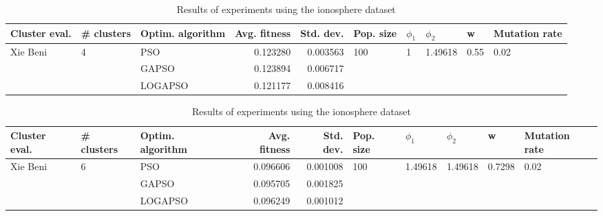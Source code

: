 \documentclass{article}
\begin{document}
\begin{table}
\centering
\caption{Results of experiments using the ionosphere dataset}
\begin{tabular}{lllrrlllll}
\toprule
            Cluster eval. &        \# clusters & Optim. algorithm &  Avg. fitness &  Std. dev. &            Pop. size &         $\phi_{1}$ &               $\phi_{2}$ &                     w &         Mutation rate \\
\midrule
\multirow{3}{*}{Xie Beni} & \multirow{3}{*}{4} &              PSO &      0.123280 &   0.003563 & \multirow{3}{*}{100} & \multirow{3}{*}{1} & \multirow{3}{*}{1.49618} & \multirow{3}{*}{0.55} & \multirow{3}{*}{0.02} \\
                          &                    &            GAPSO &      0.123894 &   0.006717 &                      &                    &                          &                       &                       \\
                          &                    &          LOGAPSO &      0.121177 &   0.008416 &                      &                    &                          &                       &                       \\
\bottomrule
\end{tabular}
\end{table}
\begin{table}
\centering
\caption{Results of experiments using the ionosphere dataset}
\begin{tabular}{lllrrlllll}
\toprule
            Cluster eval. &        \# clusters & Optim. algorithm &  Avg. fitness &  Std. dev. &            Pop. size &               $\phi_{1}$ &               $\phi_{2}$ &                       w &         Mutation rate \\
\midrule
\multirow{3}{*}{Xie Beni} & \multirow{3}{*}{6} &              PSO &      0.096606 &   0.001008 & \multirow{3}{*}{100} & \multirow{3}{*}{1.49618} & \multirow{3}{*}{1.49618} & \multirow{3}{*}{0.7298} & \multirow{3}{*}{0.02} \\
                          &                    &            GAPSO &      0.095705 &   0.001825 &                      &                          &                          &                         &                       \\
                          &                    &          LOGAPSO &      0.096249 &   0.001012 &                      &                          &                          &                         &                       \\
\bottomrule
\end{tabular}
\end{table}
\end{document}

